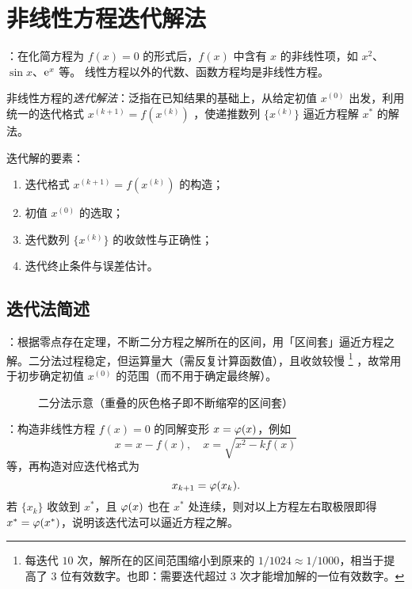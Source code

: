 \chapter{非线性方程迭代解法}
\entry {}：在化简方程为 $f(x)=0$ 的形式后，$f(x)$ 中含有 $x$ 的非线性项，如 $x^2$、$\sin x$、$\mathrm{e}^x$ 等。
线性方程以外的代数、函数方程均是非线性方程。

\entry 非线性方程的\emph{迭代解法}：泛指在已知结果的基础上，从给定初值 $x^{(0)}$
出发，利用统一的迭代格式 $x^{(k+1)}=f(x^{(k)})$ ，使递推数列 $\{x^{(k)}\}$ 逼近方程解 $x^\ast$ 的解法。

\entry 迭代解的要素：
\begin{enumerate}\tl
    \item 迭代格式 $x^{(k+1)}=f(x^{(k)})$ 的构造；
    \item 初值 $x^{(0)}$ 的选取；
    \item 迭代数列 $\{x^{(k)}\}$ 的收敛性与正确性；
    \item 迭代终止条件与误差估计。
\end{enumerate}

\section{迭代法简述}
\entry {}：根据零点存在定理，不断二分方程之解所在的区间，用「区间套」逼近方程之解。二分法过程稳定，但运算量大（需反复计算函数值），且收敛较慢
\footnote{每迭代 $10$ 次，解所在的区间范围缩小到原来的 $1/1024\approx1/1000$，相当于提高了 $3$ 位有效数字。也即：需要迭代超过 $3$ 次才能增加解的一位有效数字。}
，故常用于初步确定初值 $x^{(0)}$ 的范围（而不用于确定最终解）。
\begin{figure}[htbp]
\small\centering
{}
\caption{二分法示意（重叠的灰色格子即不断缩窄的区间套）}\label{7-f1}
\end{figure}


\entry {}：构造非线性方程 $f(x)=0$ 的同解变形 $x=\varphi(x)$，例如
\[ x = x - f(x),\quad x=\sqrt{x^2-kf(x)} \]
等，再构造对应迭代格式为
\begin{equation}
x_{k+1}=\varphi(x_k).
\end{equation}
若 $\{x_k\}$ 收敛到 $x^\ast$，且 $\varphi(x)$ 也在 $x^\ast$ 处连续，则对以上方程左右取极限即得 $x^\ast=\varphi(x^\ast)$，说明该迭代法可以逼近方程之解。

